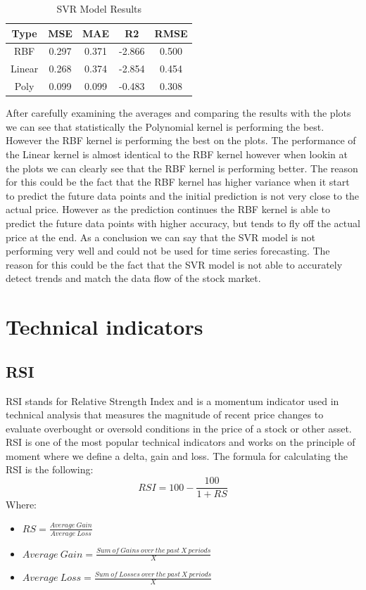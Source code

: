 \documentclass{imc-inf}
\begin{document}
	
	\begin{table}[h!]
		\centering
		\begin{tabular}{|c|c|c|c|c|}
			\hline
			\textbf{Type} & \textbf{MSE} & \textbf{MAE} & \textbf{R2} & \textbf{RMSE} \\ \hline
			RBF & 0.297 & 0.371 & -2.866 & 0.500 \\ \hline
			Linear & 0.268 & 0.374 & -2.854 & 0.454\\ \hline
			Poly & 0.099 & 0.099 & -0.483 &  0.308 \\ \hline
		\end{tabular}
		\caption{SVR Model Results}
		\label{tab:svr_model_results}
	\end{table}
	After carefully examining the averages and comparing the results with the plots we can see that statistically the Polynomial kernel is performing the best. However the RBF kernel is performing the best on the plots.
	The performance of the Linear kernel is almost identical to the RBF kernel however when lookin at the plots we can clearly see that the RBF kernel is performing better. The reason for this could be the fact that the RBF kernel has higher variance
	when it start to predict the future data points and the initial prediction is not very close to the actual price. However as the prediction continues the RBF kernel is able to predict the future data points with higher accuracy, 
	but tends to fly off the actual price at the end. As a conclusion we can say that the SVR model is not performing very well and could not be used for time series forecasting. The reason for this could be the fact that the SVR model is not able to 
	accurately detect trends and match the data flow of the stock market.
	
	\section{Technical indicators}
	\subsection{RSI}
	RSI stands for Relative Strength Index and is a momentum indicator used in technical analysis that measures the magnitude of recent price changes to
	evaluate overbought or oversold conditions in the price of a stock or other asset. RSI is one of the most popular technical indicators
	and works on the principle of moment where we define a delta, gain and loss. The formula for calculating the RSI is the following:
	\begin{equation}
		RSI = 100 - \frac{100}{1 + RS}
	\end{equation}
	Where:
	\begin{itemize}
		\item $RS = \frac{Average\ Gain}{Average\ Loss}$
		\item $Average\ Gain = \frac{Sum\ of\ Gains\ over\ the\ past\ X\ periods}{X}$
		\item $Average\ Loss = \frac{Sum\ of\ Losses\ over\ the\ past\ X\ periods}{X}$
	\end{itemize}
	
\end{document}
